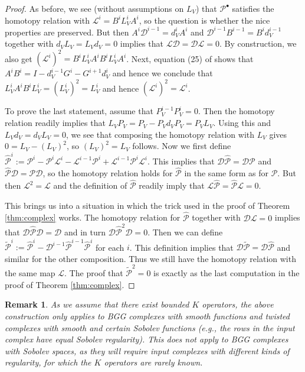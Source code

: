 \documentclass[11pt]{amsart}
\newtheorem{remark}{Remark}
\newcommand{\0}{\mathaccent23}
\newcommand{\bs}{{\scriptscriptstyle \bullet}}
\begin{document}
\begin{proof}
  As before, we see (without assumptions on $L_V$) that $\mathscr{P}^\bs$ satisfies the homotopy relation with $\mathscr{L}^i=B^iL_V^iA^i$, so the question is whether the nice properties are preserved. But then $A^i\mathscr{D}^{i-1}=d^i_VA^i$ and $\mathscr{D}^{i-1}B^{i-1}=B^id_V^{i-1}$ together with $d_VL_V=L_Vd_V=0$ implies that $\mathscr{L}\mathscr{D}=\mathscr{D}\mathscr{L}=0$. By construction, we also get $(\mathscr{L}^i)^2=B^iL^i_VA^iB^iL^i_VA^i$. Next, equation (25) of \cite{vcap2022bgg} shows that $A^iB^i=I-d^{i-1}_VG^i-G^{i+1}d^i_V$ and hence we conclude that $L^i_VA^iB^iL^i_V=(L^i_V)^2=L^i_V$ and hence $(\mathscr{L}^i)^2=\mathscr{L}^i$. 

  To prove the last statement, assume that $P^{i-1}_VP^i_V=0$. Then the homotopy relation readily implies that $L_VP_V=P_V-P_Vd_VP_V=P_VL_V$. Using this and $L_Vd_V=d_VL_V=0$, we see that composing the homotopy relation with $L_V$ gives $0=L_V-(L_V)^2$, so $(L_V)^2=L_V$ follows. Now we first define $\widehat{\mathscr{P}}^i:=\mathscr{P}^i-\mathscr{P}^i\mathscr{L}^i-\mathscr{L}^{i-1}\mathscr{P}^i+\mathscr{L}^{i-1}\mathscr{P}^i\mathscr{L}^i$. This implies that $\mathscr{D}\widehat{\mathscr{P}}=\mathscr{D}\mathscr{P}$ and $\widehat{\mathscr{P}}\mathscr{D}=\mathscr{P}\mathscr{D}$, so the homotopy relation holds for $\widehat{\mathscr{P}}$ in the same form as for $\mathscr{P}$. But then $\mathscr{L}^2=\mathscr{L}$ and the definition of $\widehat{\mathscr{P}}$ readily imply that $\mathscr{L}\widehat{\mathscr{P}}=\widehat{\mathscr{P}}\mathscr{L}=0$.

  This brings us into a situation in which the trick used in the proof of Theorem \ref{thm:complex} works. The homotopy relation for $\widehat{\mathscr{P}}$ together with $\mathscr{D}\mathscr{L}=0$ implies that $\mathscr{D}\widehat{\mathscr{P}}\mathscr{D}=\mathscr{D}$ and in turn $\mathscr{D}\widehat{\mathscr{P}}^2\mathscr{D}=0$. Then we can define $\widetilde{\mathscr{P}}^i:=\widehat{\mathscr{P}}^i-\mathscr{D}^{i-1}\widehat{\mathscr{P}}^{i-1}\widehat{\mathscr{P}}^i$ for each $i$. This definition implies that $\mathscr{D}\widetilde{\mathscr{P}}=\mathscr{D}\widehat{\mathscr{P}}$ and similar for the other composition. Thus we still have the homotopy relation with the same map $\mathscr{L}$. The proof that $\widetilde{\mathscr{P}}^2=0$ is exactly as the last computation in the proof of Theorem \ref{thm:complex}. 
\end{proof}

\begin{remark}
As we assume that there exist bounded $K$ operators, the above construction only applies to BGG complexes with smooth functions and twisted complexes with smooth and certain Sobolev functions (e.g., the rows in the input complex have equal Sobolev regularity).  This does not apply to BGG complexes with Sobolev spaces, as they will require input complexes with different kinds of regularity, for which the $K$ operators are rarely known.
\end{remark}
\end{document}
